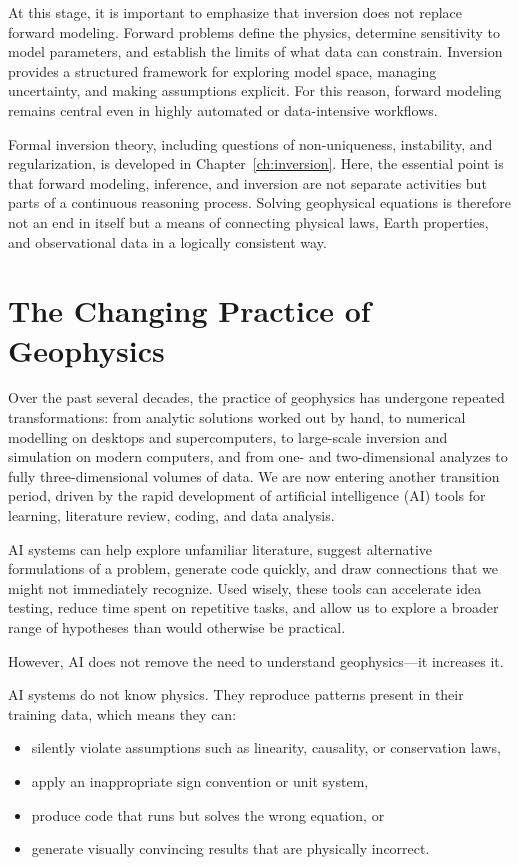 At this stage, it is important to emphasize that inversion does not replace forward modeling. Forward problems define the physics, determine sensitivity to model parameters, and establish the limits of what data can constrain. Inversion provides a structured framework for exploring model space, managing uncertainty, and making assumptions explicit. For this reason, forward modeling remains central even in highly automated or data-intensive workflows.

Formal inversion theory, including questions of non-uniqueness, instability, and regularization, is developed in Chapter~\ref{ch:inversion}. Here, the essential point is that forward modeling, inference, and inversion are not separate activities but parts of a continuous reasoning process. Solving geophysical equations is therefore not an end in itself but a means of connecting physical laws, Earth properties, and observational data in a logically consistent way.

\section{The Changing Practice of Geophysics}

Over the past several decades, the practice of geophysics has undergone repeated transformations: from analytic solutions worked out by hand, to numerical modelling on desktops and supercomputers, to large-scale inversion and simulation on modern computers, and from one- and two-dimensional analyzes to fully three-dimensional volumes of data. We are now entering another transition period, driven by the rapid development of artificial intelligence (AI) tools for learning, literature review, coding, and data analysis.

AI systems can help explore unfamiliar literature, suggest alternative formulations of a problem, generate code quickly, and draw connections that we might not immediately recognize. Used wisely, these tools can accelerate idea testing, reduce time spent on repetitive tasks, and allow us to explore a broader range of hypotheses than would otherwise be practical.

However, AI does not remove the need to understand geophysics---it increases it.

AI systems do not know physics. They reproduce patterns present in their training data, which means they can:
\begin{itemize}
    \item silently violate assumptions such as linearity, causality, or conservation laws,
    \item apply an inappropriate sign convention or unit system,
    \item produce code that runs but solves the wrong equation, or
    \item generate visually convincing results that are physically incorrect.
\end{itemize}

